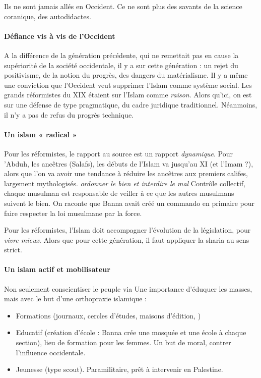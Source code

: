 \begin{Synthesis}
Ils ne sont jamais allés en Occident. Ce ne sont plus des savants de la science coranique, des autodidactes. 
\end{Synthesis}

\paragraph{Défiance vis à vis de l'Occident} A la différence de la génération précédente, qui ne remettait pas en cause la supériorité de la société occidentale, il y a sur cette génération : un rejet du positivisme, de la notion du progrès, des dangers du matérialisme. Il y a même une conviction que l'Occident veut supprimer l'Islam comme système social. Les grands réformistes du XIX étaient sur l'Islam comme \textit{raison}. Alors qu'ici, on est sur une défense de type pragmatique, du cadre juridique traditionnel. Néanmoins, il n'y a pas de refus du progrès technique. 

\paragraph{ Un islam « radical »} Pour les réformistes, le rapport au source est un rapport \textit{dynamique}. Pour 'Abduh, les ancêtres (Salafs), les débuts de l'Islam va jusqu'au XI (et l'Imam ?), alors que l'on va avoir une tendance à réduire les ancêtres aux premiers califes, largement mythologisés. \textit{ordonner le bien et interdire le mal} Contrôle collectif, chaque musulman est responsable de veiller à ce que les autres musulmans suivent le bien. On raconte que Banna avait créé un commando en primaire pour faire respecter la loi musulmane par la force.

Pour les réformistes, l'Islam doit accompagner l'évolution de la législation, pour \textit{vivre mieux}. Alors que pour cette génération, il faut appliquer la sharia au sens strict.

\paragraph{Un islam actif et mobilisateur} Non seulement conscientiser le peuple via Une importance d'éduquer les masses, mais avec le but d'une orthopraxie islamique : 
\begin{itemize}
    \item Formations (journaux, cercles d'études, maisons d'édition, )
    \item Educatif (création d'école : Banna crée une mosquée et une école à chaque section), lieu de formation pour les femmes. Un but de moral, contrer l'influence occidentale.
    \item Jeunesse (type scout). Paramilitaire, prêt à intervenir en Palestine.  
\end{itemize}

